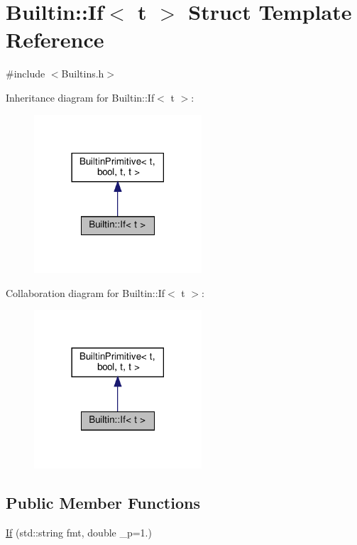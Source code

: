\hypertarget{struct_builtin_1_1_if}{}\section{Builtin\+:\+:If$<$ t $>$ Struct Template Reference}
\label{struct_builtin_1_1_if}


{\ttfamily \#include $<$Builtins.\+h$>$}



Inheritance diagram for Builtin\+:\+:If$<$ t $>$\+:\nopagebreak
\begin{figure}[H]
\begin{center}
\leavevmode
\includegraphics[width=177pt]{struct_builtin_1_1_if__inherit__graph}
\end{center}
\end{figure}


Collaboration diagram for Builtin\+:\+:If$<$ t $>$\+:\nopagebreak
\begin{figure}[H]
\begin{center}
\leavevmode
\includegraphics[width=177pt]{struct_builtin_1_1_if__coll__graph}
\end{center}
\end{figure}
\subsection*{Public Member Functions}
\begin{DoxyCompactItemize}
\item 
\hyperlink{struct_builtin_1_1_if_a4ea649fb18a5c42445c5c48e8549c951}{If} (std\+::string fmt, double \+\_\+p=1.)
\end{DoxyCompactItemize}
